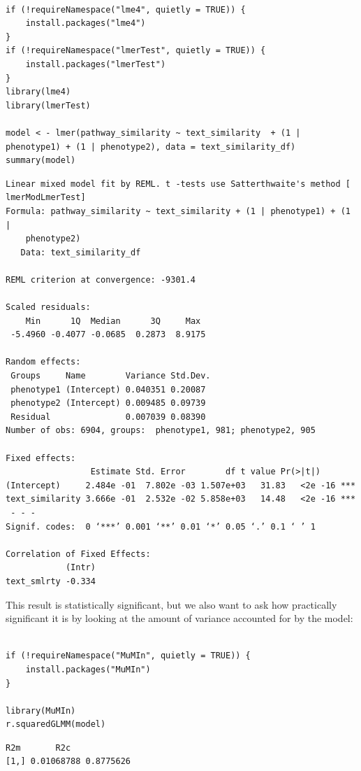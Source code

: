 \begin{lstlisting}[style=R]
%%R -i text_similarity_df

if (!requireNamespace("lme4", quietly = TRUE)) {
    install.packages("lme4")
}
if (!requireNamespace("lmerTest", quietly = TRUE)) {
    install.packages("lmerTest")
}
library(lme4)
library(lmerTest)

model < - lmer(pathway_similarity ~ text_similarity  + (1 | phenotype1) + (1 | phenotype2), data = text_similarity_df)
summary(model)
\end{lstlisting}

\begin{lstlisting}[style=shell]
Linear mixed model fit by REML. t -tests use Satterthwaite's method [
lmerModLmerTest]
Formula: pathway_similarity ~ text_similarity + (1 | phenotype1) + (1 |  
    phenotype2)
   Data: text_similarity_df

REML criterion at convergence: -9301.4

Scaled residuals: 
    Min      1Q  Median      3Q     Max 
 -5.4960 -0.4077 -0.0685  0.2873  8.9175 

Random effects:
 Groups     Name        Variance Std.Dev.
 phenotype1 (Intercept) 0.040351 0.20087 
 phenotype2 (Intercept) 0.009485 0.09739 
 Residual               0.007039 0.08390 
Number of obs: 6904, groups:  phenotype1, 981; phenotype2, 905

Fixed effects:
                 Estimate Std. Error        df t value Pr(>|t|)    
(Intercept)     2.484e -01  7.802e -03 1.507e+03   31.83   <2e -16 ***
text_similarity 3.666e -01  2.532e -02 5.858e+03   14.48   <2e -16 ***
 - - -
Signif. codes:  0 ‘***’ 0.001 ‘**’ 0.01 ‘*’ 0.05 ‘.’ 0.1 ‘ ’ 1

Correlation of Fixed Effects:
            (Intr)
text_smlrty -0.334
\end{lstlisting}

This result is statistically significant, but we also want to ask how practically significant it is by looking at the amount of variance accounted for by the model:

\begin{lstlisting}[style=R]
%%R

if (!requireNamespace("MuMIn", quietly = TRUE)) {
    install.packages("MuMIn")
}

library(MuMIn)
r.squaredGLMM(model)
\end{lstlisting}

\begin{lstlisting}
R2m       R2c
[1,] 0.01068788 0.8775626
\end{lstlisting}

